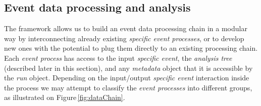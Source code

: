 
\subsection{Event data processing and analysis}

The framework allows us to build an event data processing chain in a modular way by interconnecting already existing \emph{specific event processes}, or to develop new ones with the potential to plug them directly to an existing processing chain. Each \emph{event process} has access to the input \emph{specific event}, the \emph{analysis tree} (described later in this section), and any \emph{metadata} object that it is accessible by the \emph{run} object. Depending on the input/output \emph{specific event} interaction inside the process we may attempt to classify the \emph{event processes} into different groups, as illustrated on Figure\,\ref{fig:dataChain}.



